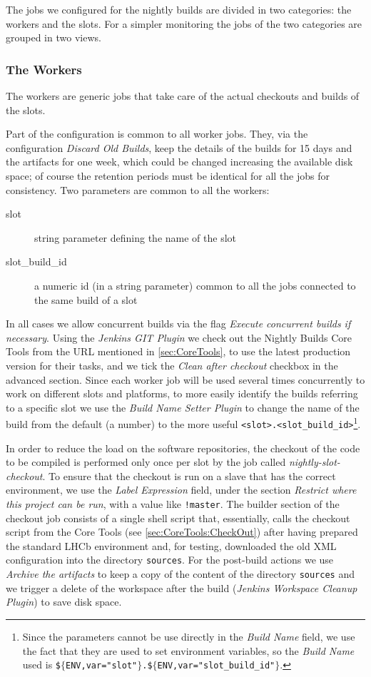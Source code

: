 The jobs we configured for the nightly builds are divided in two categories: the
workers and the slots.  For a simpler monitoring the jobs of the two categories
are grouped in two views.

\subsubsection{The Workers}
\label{sec:Jenkins:Workers}
The workers are generic jobs that take care of the actual checkouts and builds
of the slots.

Part of the configuration is common to all worker jobs.  They, via the
configuration \emph{Discard Old Builds}, keep the details of the builds for 15
days and the artifacts for one week, which could be changed increasing the
available disk space; of course the retention periods must be identical for all
the jobs for consistency.  Two parameters are common to all the workers:
\begin{description}
  \item[slot] string parameter defining the name of the slot
  \item[slot\_build\_id] a numeric id (in a string parameter) common to all the
jobs connected to the same build of a slot
\end{description}
In all cases we allow concurrent builds via the flag \emph{Execute concurrent
builds if necessary}.  Using the \emph{Jenkins GIT Plugin} we check out the
Nightly Builds Core Tools from the URL mentioned in \ref{sec:CoreTools}, to use the
latest production version for their tasks, and we tick the \emph{Clean after
checkout} checkbox in the advanced section.  Since each worker job will be used
several times concurrently to work on different slots and platforms, to more
easily identify the builds referring to a specific slot we use the \emph{Build
Name Setter Plugin} to change the name of the build from the default (a number)
to the more useful \verb|<slot>.<slot_build_id>|\footnote{Since the parameters
cannot be use directly in the \emph{Build Name} field, we use the fact that they
are used to set environment variables, so the \emph{Build Name} used is
\texttt{\$$\{$ENV,var="slot"$\}$.\$$\{$ENV,var="slot\_build\_id"$\}$}.}.

In order to reduce the load on the software repositories, the checkout of the
code to be compiled is performed only once per slot by the job called
\emph{nightly-slot-checkout}.  To ensure that the checkout is run on a slave
that has the correct environment, we use the \emph{Label Expression} field,
under the section \emph{Restrict where this project can be run}, with a value
like \verb|!master|.  The builder section of the checkout job consists of a
single shell script that, essentially, calls the checkout script from the Core
Tools (see \ref{sec:CoreTools:CheckOut}) after having prepared the standard LHCb
environment and, for testing, downloaded the old XML configuration into the
directory \texttt{sources}.  For the post-build actions we use \emph{Archive the
artifacts} to keep a copy of the content of the directory \texttt{sources} and
we trigger a delete of the workspace after the build (\emph{Jenkins Workspace
Cleanup Plugin}) to save disk space.

